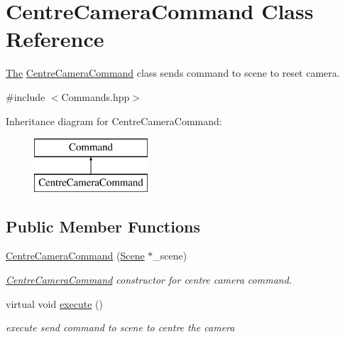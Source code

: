 \hypertarget{class_centre_camera_command}{}\section{Centre\+Camera\+Command Class Reference}
\label{class_centre_camera_command}


\hyperlink{namespace_the}{The} \hyperlink{class_centre_camera_command}{Centre\+Camera\+Command} class sends command to scene to reset camera.  




{\ttfamily \#include $<$Commands.\+hpp$>$}

Inheritance diagram for Centre\+Camera\+Command\+:\begin{figure}[H]
\begin{center}
\leavevmode
\includegraphics[height=2.000000cm]{class_centre_camera_command}
\end{center}
\end{figure}
\subsection*{Public Member Functions}
\begin{DoxyCompactItemize}
\item 
\hyperlink{class_centre_camera_command_af1316a52e8d3d6be5b0ff96e219d0610}{Centre\+Camera\+Command} (\hyperlink{class_scene}{Scene} $\ast$\+\_\+scene)
\begin{DoxyCompactList}\small\item\em \hyperlink{class_centre_camera_command}{Centre\+Camera\+Command} constructor for centre camera command. \end{DoxyCompactList}\item 
\hypertarget{class_centre_camera_command_ac19aca98708762326b0ae529c2d72523}{}virtual void \hyperlink{class_centre_camera_command_ac19aca98708762326b0ae529c2d72523}{execute} ()\label{class_centre_camera_command_ac19aca98708762326b0ae529c2d72523}

\begin{DoxyCompactList}\small\item\em execute send command to scene to centre the camera \end{DoxyCompactList}\end{DoxyCompactItemize}


